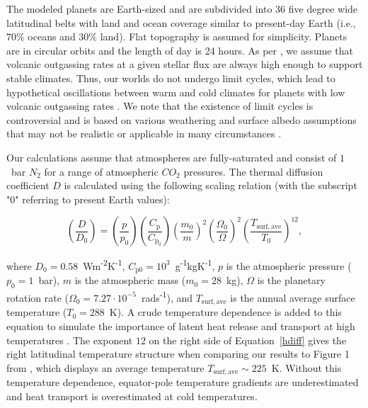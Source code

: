 \documentclass[fleqn,usenatbib]{mnras}
\providecommand{\DIFdel}[1]{} %
\providecommand{\DIFdelbegin}{} %
\providecommand{\DIFdelend}{} %
\newcommand{\DIFscaledelfig}{0.5}
\newlength{\DIFdelgraphicswidth} %
\newlength{\DIFdelgraphicsheight} %
\newcommand{\DIFdelincludegraphics}[2][]{%
\sbox{\DIFdelgraphicsbox}{\DIFOincludegraphics[#1]{#2}}%
\settoboxwidth{\DIFdelgraphicswidth}{\DIFdelgraphicsbox} %
\settoboxtotalheight{\DIFdelgraphicsheight}{\DIFdelgraphicsbox} %
\scalebox{\DIFscaledelfig}{%
\parbox[b]{\DIFdelgraphicswidth}{\usebox{\DIFdelgraphicsbox}\\[-\baselineskip] \rule{\DIFdelgraphicswidth}{0em}}\llap{\resizebox{\DIFdelgraphicswidth}{\DIFdelgraphicsheight}{%
\setlength{\unitlength}{\DIFdelgraphicswidth}%
\begin{picture}(1,1)%
\thicklines\linethickness{2pt} %
{\color[rgb]{1,0,0}\put(0,0){\framebox(1,1){}}}%
{\color[rgb]{1,0,0}\put(0,0){\line( 1,1){1}}}%
{\color[rgb]{1,0,0}\put(0,1){\line(1,-1){1}}}%
\end{picture}%
}\hspace*{3pt}}} %
} %
\DeclareRobustCommand{\DIFdelbegin}{\DIFOdelbegin \let\includegraphics\DIFdelincludegraphics} %
\DeclareRobustCommand{\DIFdelend}{\DIFOaddend \let\includegraphics\DIFOincludegraphics} %
\begin{document}
The modeled planets are Earth-sized and are subdivided into 36 five degree wide latitudinal belts with land and ocean coverage similar to present-day Earth (i.e., $70 \%$ oceans and $30 \%$ land). Flat topography is assumed for simplicity. Planets are in circular orbits and the length of day is 24 hours. As per \citet{Turbet2017}, we assume that volcanic outgassing rates at a given stellar flux are always high enough to support stable climates. Thus, our worlds do not undergo limit cycles, which lead to hypothetical oscillations between warm and cold climates for planets with low volcanic outgassing rates \citep{haqq2016limit,paradise2017,kadoya_outer_2019}. We note that the existence of limit cycles is controversial and is based on various weathering and surface albedo assumptions that may not be realistic or applicable in many circumstances \citep{ramirez2017mars,graham-a}.

Our calculations assume that atmospheres are fully-saturated and consist of $1$~bar $N_{\mathrm{2}}$ for a range of atmospheric $CO_{\mathrm{2}}$ pressures. The thermal diffusion coefficient $D$ is calculated using the following scaling relation (with the subscript "$0$" referring to present Earth values):

\begin{equation}
\label{hdiff}
    \left(\frac{D}{D_{\mathrm{0}}}\right)=\left(\frac{p}{p_{\mathrm{0}}}\right)\left(\frac{C_{\mathrm{p}}}{C_{\mathrm{p}_{0}}}\right)\left(\frac{m_{\mathrm{0}}}{m}\right)^{2}\left(\frac{\Omega_{0}}{\Omega}\right)^{2}\left(\frac{T_{\mathrm{surf,ave}}}{T_{\mathrm{0}}}\right)^{12},
\end{equation}
\DIFdelbegin %

\DIFdelend where $D_{\mathrm{0}}=0.58$~Wm\textsuperscript{-2}K\textsuperscript{-1}, $C_{\mathrm{p0}}=10^{3}$~g\textsuperscript{-1}kgK\textsuperscript{-1}\DIFdelbegin \DIFdel{)}\DIFdelend , $p$ is the atmospheric pressure ($p_{\mathrm{0}}=1$~bar), $m$ is the atmospheric mass ($m_{\mathrm{0}}=28$~kg), $\Omega$ is the planetary rotation rate ($\Omega_{\mathrm{0}}=7.27 \cdot 10^{\mathrm{-5}}$~rads\textsuperscript{-1}), and $T_{\mathrm{surf,ave}}$ is the annual average surface temperature ($T_{\mathrm{0}}=288$~K). A crude temperature dependence is added to this equation to simulate the importance of latent heat release and transport at high temperatures \citep{Caballero2005a,Rose2017}. The exponent $12$ on the right side of Equation~\ref{hdiff} gives the right latitudinal temperature structure when comparing our results to Figure 1 from \citet{Turbet2017}, which displays an average temperature $T_{\mathrm{surf,ave}} \sim 225$~K. Without this temperature dependence, equator-pole temperature gradients are underestimated and heat transport is overestimated at cold temperatures.
\end{document}
